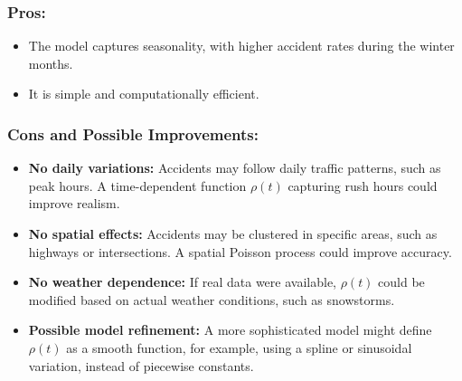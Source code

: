 \documentclass{article}
\begin{document}
\subsubsection*{Pros:}
\begin{itemize}
    \item The model captures seasonality, with higher accident rates during the winter months.
    \item It is simple and computationally efficient.
\end{itemize}

\subsubsection*{Cons and Possible Improvements:}

\begin{itemize}
    \item \textbf{No daily variations:} Accidents may follow daily traffic patterns, such as peak hours. A time-dependent function $\rho(t)$ capturing rush hours could improve realism.
    \item \textbf{No spatial effects:} Accidents may be clustered in specific areas, such as highways or intersections. A spatial Poisson process could improve accuracy.
    \item \textbf{No weather dependence:} If real data were available, $\rho(t)$ could be modified based on actual weather conditions, such as snowstorms.
    \item \textbf{Possible model refinement:} A more sophisticated model might define $\rho(t)$ as a smooth function, for example, using a spline or sinusoidal variation, instead of piecewise constants.
\end{itemize}
\end{document}
